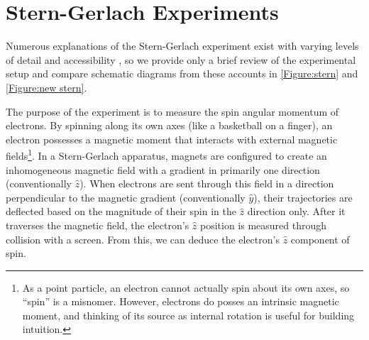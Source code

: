 %
%
%
%

\chapter{Stern-Gerlach Experiments}
Numerous explanations of the Stern-Gerlach experiment exist with varying levels of detail and accessibility \cite{mcintyre, bocking, rodriguez, stern}, so we provide only a brief review of the experimental setup and compare schematic diagrams from these accounts in  \autoref{Figure:stern} and \autoref{Figure:new stern}.

The purpose of the experiment is to measure the spin angular momentum of electrons. By spinning along its own axes (like a basketball on a finger), an electron possesses a magnetic moment that interacts with external magnetic fields\footnote{As a point particle, an electron cannot actually spin about its own axes, so ``spin'' is a misnomer. However, electrons do posses an intrinsic magnetic moment, and thinking of its source as internal rotation is useful for building intuition.}. In a Stern-Gerlach apparatus, magnets are configured to create an inhomogeneous magnetic field with a gradient in primarily one direction (conventionally $\hat{z}$). When electrons are sent through this field in a direction perpendicular to the magnetic gradient (conventionally $\hat{y}$), their trajectories are deflected based on the magnitude of their spin in the $\hat{z}$ direction only. After it traverses the magnetic field, the electron's $\hat{z}$ position is measured through collision with a screen. From this, we can deduce the electron's $\hat{z}$ component of spin.

